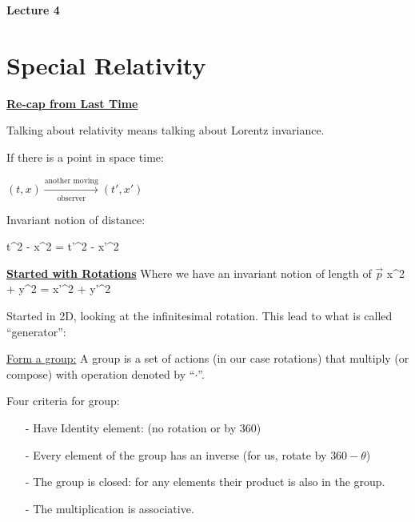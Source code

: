 




\thispagestyle{fancy}

\begin{center}
{\huge \textbf{Lecture 4}}
\end{center}

{\fontsize{14}{16}\selectfont


\section*{Special Relativity}

\underline{\textbf{Re-cap from Last Time}}

Talking about relativity means talking about Lorentz invariance.

If there is a point in space time: \\
\begin{center}
$(t,x) \xrightarrow[\text{observer}]{\text{another moving}} (t', x')$
\end{center}

Invariant notion of distance:
 
\be
t^2 - x^2 = t'^2 - x'^2
\ee

\underline{\textbf{Started with Rotations}}
Where we have an invariant notion of length of $\vec{p}$
\be
x^2 + y^2 = x'^2 + y'^2
\ee

Started in 2D, looking at the infinitesimal rotation.
This lead to what is called ``generator'':

\begin{center}
\IMatrix
\end{center}

\underline{Form a group:}
A group is a set of actions (in our case rotations) that multiply (or compose) with operation denoted by ``$\cdot$''.

Four criteria for group:
\begin{itemize}
\item[-] Have Identity element:  (no rotation or by 360)
\item[-] Every element of the group has an inverse (for us, rotate by $360-\theta$)
\item[-] The group is closed:  for any elements their product is also in the group.
\item[-] The multiplication is associative.
\end{itemize}

}
